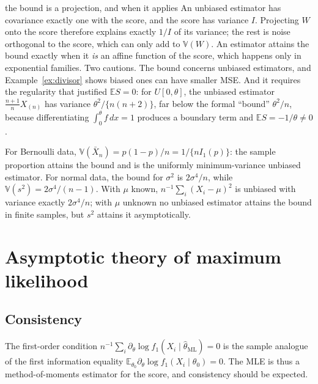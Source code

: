 \documentclass[11pt,a4paper]{article}
\newcommand{\E}{\mathbb{E}}
\newcommand{\V}{\mathbb{V}}
\newcommand{\Xbar}{\bar X_n}
\newcommand{\thml}{\hat\theta_{\mathrm{ML}}}
\begin{document}
\begin{whybox}{the bound is a projection, and when it applies}
An unbiased estimator has covariance exactly one with the score, and the score has variance $I$. Projecting $W$ onto the score therefore explains exactly $1/I$ of its variance; the rest is noise orthogonal to the score, which can only add to $\V(W)$. An estimator attains the bound exactly when it \emph{is} an affine function of the score, which happens only in exponential families. Two cautions. The bound concerns unbiased estimators, and Example~\ref{ex:divisor} shows biased ones can have smaller MSE. And it requires the regularity that justified $\E S=0$: for $U[0,\theta]$, the unbiased estimator $\frac{n+1}{n}X_{(n)}$ has variance $\theta^2/\{n(n+2)\}$, far below the formal ``bound'' $\theta^2/n$, because differentiating $\int_0^\theta f\,dx=1$ produces a boundary term and $\E S=-1/\theta\neq0$.
\end{whybox}

\begin{example}
For Bernoulli data, $\V(\Xbar)=p(1-p)/n=1/\{nI_1(p)\}$: the sample proportion attains the bound and is the uniformly minimum-variance unbiased estimator. For normal data, the bound for $\sigma^2$ is $2\sigma^4/n$, while $\V(s^2)=2\sigma^4/(n-1)$. With $\mu$ known, $n^{-1}\sum_i(X_i-\mu)^2$ is unbiased with variance exactly $2\sigma^4/n$; with $\mu$ unknown no unbiased estimator attains the bound in finite samples, but $s^2$ attains it asymptotically.
\end{example}

\section{Asymptotic theory of maximum likelihood}\label{sec:mle}

\subsection{Consistency}

The first-order condition $n^{-1}\sum_i\partial_\theta\log f_1(X_i\mid\thml)=0$ is the sample analogue of the first information equality $\E_{\theta_0}\partial_\theta\log f_1(X_i\mid\theta_0)=0$. The MLE is thus a method-of-moments estimator for the score, and consistency should be expected.
\end{document}
